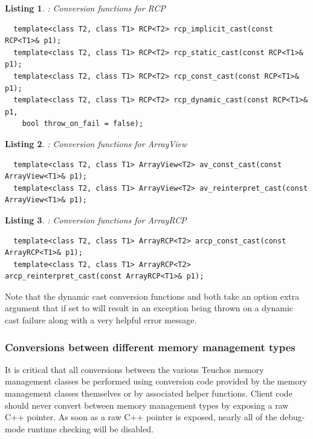 \documentclass[pdf,ps2pdf,11pt]{SANDreport}
\newtheorem{listing}{Listing}
\begin{document}
\begin{listing}: Conversion functions for RCP\\
\label{listing:RCP-conversions}
{\small\begin{verbatim}
  template<class T2, class T1> RCP<T2> rcp_implicit_cast(const RCP<T1>& p1);
  template<class T2, class T1> RCP<T2> rcp_static_cast(const RCP<T1>& p1);
  template<class T2, class T1> RCP<T2> rcp_const_cast(const RCP<T1>& p1);
  template<class T2, class T1> RCP<T2> rcp_dynamic_cast(const RCP<T1>& p1,
    bool throw_on_fail = false);
\end{verbatim}}
\end{listing}


\begin{listing}: Conversion functions for ArrayView\\
\label{listing:ArrayView-conversions}
{\small\begin{verbatim}
  template<class T2, class T1> ArrayView<T2> av_const_cast(const ArrayView<T1>& p1);
  template<class T2, class T1> ArrayView<T2> av_reinterpret_cast(const ArrayView<T1>& p1);
\end{verbatim}}
\end{listing}


\begin{listing}: Conversion functions for ArrayRCP\\
\label{listing:ArrayRCP-conversions}
{\small\begin{verbatim}
  template<class T2, class T1> ArrayRCP<T2> arcp_const_cast(const ArrayRCP<T1>& p1);
  template<class T2, class T1> ArrayRCP<T2> arcp_reinterpret_cast(const ArrayRCP<T1>& p1);
\end{verbatim}}
\end{listing}


Note that the dynamic cast conversion functions
{} and {}
both take an option extra argument {} that if
set to {} will result in an exception being thrown on a
dynamic cast failure along with a very helpful error message.


%
{}\subsubsection{Conversions between different memory management types}
\label{sec:teuchos-type-conversions}
%

It is critical that all conversions between the various Teuchos memory
management classes be performed using conversion code provided by the
memory management classes themselves or by associated helper
functions.  Client code should never convert between memory management
types by exposing a raw C++ pointer.  As soon as a raw C++ pointer is
exposed, nearly all of the debug-mode runtime checking will be
disabled.
\end{document}
